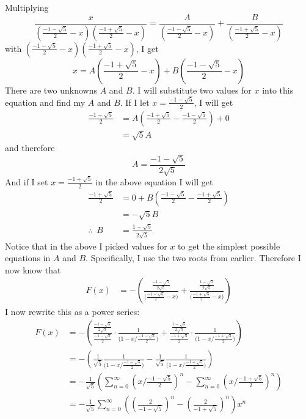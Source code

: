 Multiplying
\[
\frac{x}{
\left( \frac{-1 - \sqrt{5}}{2} - x\right)
\left( \frac{-1 + \sqrt{5}}{2} - x\right)
} 
= 
\frac{A}{\left( \frac{-1 - \sqrt{5}}{2} - x\right) } + 
\frac{B}{\left( \frac{-1 + \sqrt{5}}{2} - x\right) }
\]
with
$\left( \frac{-1 - \sqrt{5}}{2} - x \right)
\left( \frac{-1 + \sqrt{5}}{2} - x \right)$, I get
\[
x
= 
A \left( \frac{-1 + \sqrt{5}}{2} - x\right)
+
B \left( \frac{-1 - \sqrt{5}}{2} - x\right)
\]
There are two unknowns $A$ and $B$.
I will substitute two values for $x$ into this equation and find my
$A$ and $B$.
If I let $x = \frac{-1 - \sqrt{5}}{2}$, I will get
\begin{align*}
\frac{-1 - \sqrt{5}}{2} 
&= 
A 
\left( \frac{-1 + \sqrt{5}}{2} -  \frac{-1 - \sqrt{5}}{2} \right) + 0 \\
&= 
\sqrt{5} A
\end{align*}
and therefore
\[
A =  
\frac{-1 - \sqrt{5}}{2\sqrt{5}} 
\]
And if I set $x = 
\frac{-1 + \sqrt{5}}{2}$ 
in the above equation I will get
\begin{align*}
\frac{-1 + \sqrt{5}}{2}
&=
0 + B \left( \frac{-1 - \sqrt{5}}{2} - \frac{-1 + \sqrt{5}}{2}
\right) \\
&= -\sqrt{5} B \\
\therefore \,\,\,
B 
&=
\frac{1 - \sqrt{5}}{2 \sqrt{5}} 
\end{align*}
Notice that in the above I picked values for $x$ to get the simplest
possible equations in $A$ and $B$.
Specifically, I use the two roots from earlier.
Therefore I now know that
\begin{align*}
F(x)
&= 
- \left(
\frac{\frac{-1 - \sqrt{5}}{2\sqrt{5}}}{\bigl( \frac{-1 - \sqrt{5}}{2} - x\bigr) } + 
\frac{\frac{1 - \sqrt{5}}{2\sqrt{5}}}{\bigl( \frac{-1 + \sqrt{5}}{2} - x\bigr) } \right)
\end{align*}
I now rewrite this as a power series:
\begin{align*}
F(x)
&=
- \left(
\frac{\frac{-1 - \sqrt{5}}{2\sqrt{5}}}{\frac{-1 - \sqrt{5}}{2}} \cdot 
\frac{1}{\bigl( 1 - x / \frac{-1 - \sqrt{5}}{2} \bigr) } + 
\frac{\frac{1 - \sqrt{5}}{2\sqrt{5}}}{\frac{-1 + \sqrt{5}}{2}}  \cdot
\frac{1}{\bigl( 1 - x / \frac{-1 + \sqrt{5}}{2} \bigr) } 
\right)
\\
&=
- \left(
\frac{1}{\sqrt{5}}
\frac{1}{\bigl( 1 - x / \frac{-1 - \sqrt{5}}{2} \bigr) }
-
\frac{1}{\sqrt{5}} 
\frac{1}{\bigl( 1 - x / \frac{-1 + \sqrt{5}}{2} \bigr) } 
\right)
\\
&= -
\frac{1}{\sqrt{5}} \left( 
\sum_{n=0}^\infty \left( x \bigg/ \frac{-1 - \sqrt{5}}{2} \right)^n
-
\sum_{n=0}^\infty \left( x \bigg/ \frac{-1 + \sqrt{5}}{2} \right)^n
\right) \\
&= -
\frac{1}{\sqrt{5}}  
\sum_{n=0}^\infty 
\left(
\left( \frac{2}{-1 - \sqrt{5}} \right)^n
-
\left( \frac{2}{-1 + \sqrt{5}} \right)^n
\right)
x^n
\end{align*}
